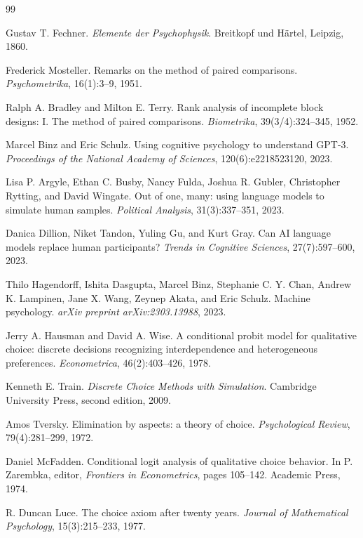 \documentclass[11pt]{article}
\begin{document}
\begin{thebibliography}{99}

Gustav T. Fechner.
\emph{Elemente der Psychophysik}.
Breitkopf und H\"artel, Leipzig, 1860.

Frederick Mosteller.
Remarks on the method of paired comparisons.
\emph{Psychometrika}, 16(1):3--9, 1951.

Ralph A. Bradley and Milton E. Terry.
Rank analysis of incomplete block designs: I. The method of paired
comparisons.
\emph{Biometrika}, 39(3/4):324--345, 1952.

Marcel Binz and Eric Schulz.
Using cognitive psychology to understand GPT-3.
\emph{Proceedings of the National Academy of Sciences},
120(6):e2218523120, 2023.

Lisa P. Argyle, Ethan C. Busby, Nancy Fulda, Joshua R. Gubler,
Christopher Rytting, and David Wingate.
Out of one, many: using language models to simulate human samples.
\emph{Political Analysis}, 31(3):337--351, 2023.

Danica Dillion, Niket Tandon, Yuling Gu, and Kurt Gray.
Can AI language models replace human participants?
\emph{Trends in Cognitive Sciences}, 27(7):597--600, 2023.

Thilo Hagendorff, Ishita Dasgupta, Marcel Binz, Stephanie C. Y. Chan,
Andrew K. Lampinen, Jane X. Wang, Zeynep Akata, and Eric Schulz.
Machine psychology.
\emph{arXiv preprint arXiv:2303.13988}, 2023.

Jerry A. Hausman and David A. Wise.
A conditional probit model for qualitative choice: discrete decisions
recognizing interdependence and heterogeneous preferences.
\emph{Econometrica}, 46(2):403--426, 1978.

Kenneth E. Train.
\emph{Discrete Choice Methods with Simulation}.
Cambridge University Press, second edition, 2009.

Amos Tversky.
Elimination by aspects: a theory of choice.
\emph{Psychological Review}, 79(4):281--299, 1972.

Daniel McFadden.
Conditional logit analysis of qualitative choice behavior.
In P. Zarembka, editor, \emph{Frontiers in Econometrics}, pages
105--142. Academic Press, 1974.

R. Duncan Luce.
The choice axiom after twenty years.
\emph{Journal of Mathematical Psychology}, 15(3):215--233, 1977.


\end{thebibliography}
\end{document}
